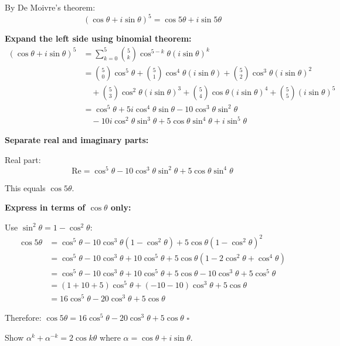 \begin{solution}[Sketch]
By De Moivre's theorem:
\[
(\cos\theta + i\sin\theta)^5 = \cos 5\theta + i\sin 5\theta
\]

\textbf{Expand the left side using binomial theorem:}
\begin{align*}
(\cos\theta + i\sin\theta)^5 &= \sum_{k=0}^{5} \binom{5}{k} \cos^{5-k}\theta (i\sin\theta)^k\\
&= \binom{5}{0}\cos^5\theta + \binom{5}{1}\cos^4\theta(i\sin\theta) + \binom{5}{2}\cos^3\theta(i\sin\theta)^2\\
&\quad + \binom{5}{3}\cos^2\theta(i\sin\theta)^3 + \binom{5}{4}\cos\theta(i\sin\theta)^4 + \binom{5}{5}(i\sin\theta)^5\\
&= \cos^5\theta + 5i\cos^4\theta\sin\theta - 10\cos^3\theta\sin^2\theta\\
&\quad - 10i\cos^2\theta\sin^3\theta + 5\cos\theta\sin^4\theta + i\sin^5\theta
\end{align*}

\textbf{Separate real and imaginary parts:}

Real part:
\[
\text{Re} = \cos^5\theta - 10\cos^3\theta\sin^2\theta + 5\cos\theta\sin^4\theta
\]

This equals $\cos 5\theta$.

\textbf{Express in terms of $\cos\theta$ only:}

Use $\sin^2\theta = 1 - \cos^2\theta$:
\begin{align*}
\cos 5\theta &= \cos^5\theta - 10\cos^3\theta(1-\cos^2\theta) + 5\cos\theta(1-\cos^2\theta)^2\\
&= \cos^5\theta - 10\cos^3\theta + 10\cos^5\theta + 5\cos\theta(1 - 2\cos^2\theta + \cos^4\theta)\\
&= \cos^5\theta - 10\cos^3\theta + 10\cos^5\theta + 5\cos\theta - 10\cos^3\theta + 5\cos^5\theta\\
&= (1 + 10 + 5)\cos^5\theta + (-10 - 10)\cos^3\theta + 5\cos\theta\\
&= 16\cos^5\theta - 20\cos^3\theta + 5\cos\theta
\end{align*}

Therefore: $\cos 5\theta = 16\cos^5\theta - 20\cos^3\theta + 5\cos\theta$ \quad $\square$

\end{solution}

\begin{problem}
Show $\alpha^k + \alpha^{-k} = 2\cos k\theta$ where $\alpha = \cos\theta + i\sin\theta$.
\end{problem}


